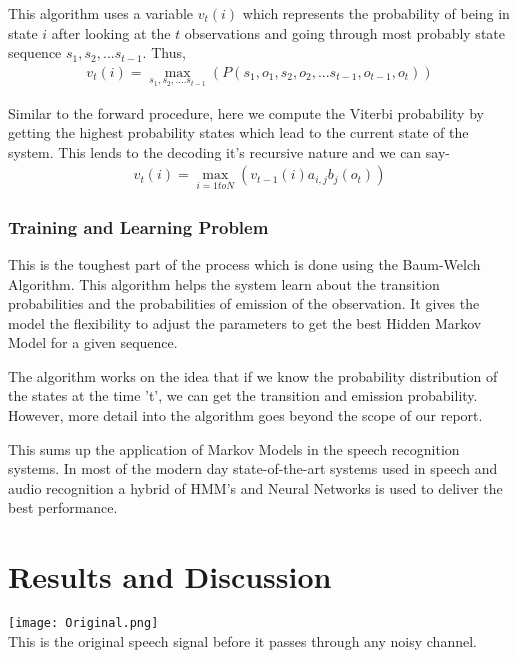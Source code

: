 \documentclass[10pt,twocolumn,letterpaper]{article}
\begin{document}
This algorithm uses a variable $v_t(i)$ which represents the probability of being in state $i$ after looking at the $t$ observations and going through most probably state sequence $s_1, s_2,... s_{t-1}$. Thus,
\begin{align*}
    v_t(i) = \mathop{max}_{s_1, s_2,....s_{t-1}}( P(s_1, o_1, s_2, o_2,... s_{t-1}, o_{t-1}, o_t))
\end{align*}

Similar to the forward procedure, here we compute the Viterbi probability by getting the highest probability states which lead to the current state of the system. This lends to the decoding it's recursive nature and we can say- \\
\begin{align*}
    v_t(i) = \mathop{max}_{i = 1 to N} (v_{t-1}(i)a_{i,j}b_j(o_t))
\end{align*}

\subsubsection{Training and Learning Problem}
This is the toughest part of the process which is done using the Baum-Welch Algorithm. This algorithm helps the system learn about the transition probabilities and the probabilities of emission of the observation. It gives the model the flexibility to adjust the parameters to get the best Hidden Markov Model for a given sequence.

The algorithm works on the idea that if we know the probability distribution of the states at the time 't', we can get the transition and emission probability. However, more detail into the algorithm goes beyond the scope of our report.

This sums up the application of Markov Models in the speech recognition systems. In most of the modern day state-of-the-art systems used in speech and audio recognition a hybrid of HMM's and Neural Networks is used to deliver the best performance.

\section{Results and Discussion}

\begin{center}
    \texttt{[image: Original.png]}\\
    This is the original speech signal before it passes through any noisy channel. 
\end{center}
\end{document}
